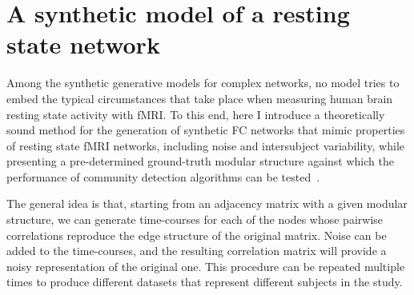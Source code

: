 
% 


\section{A synthetic model of a resting state network}
Among the synthetic generative models for complex networks, no model tries to embed the typical circumstances that take place when measuring human brain resting state activity with fMRI.
To this end, here I introduce a theoretically sound method for the generation of synthetic FC networks that mimic properties of resting state fMRI networks, including noise and intersubject variability, while presenting a pre-determined ground-truth modular structure against which the performance of community detection algorithms can be tested~\cite{nicolini2017}.

The general idea is that, starting from an adjacency matrix with a given modular structure, we can generate time-courses for each of the nodes whose pairwise correlations reproduce the edge structure of the original matrix. Noise can be added to the time-courses, and the resulting correlation matrix will provide a noisy representation of the original one. This procedure can be repeated multiple times to produce different datasets that represent different subjects in the study.

